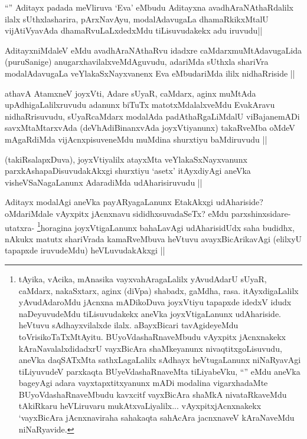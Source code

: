 \begin{artha}
``\stext'' Aditayx padada meVliruva `Eva' eMbudu Aditayxna avadhAraNAthaRdalilx ilalx sUthxlasharira, pArxNavAyu, modalAdavugaLa dhamaRkikxMtalU vijAtiVyavAda dhamaRvuLaLxdedxMdu tiLisuvudakekx adu iruvudu||
\end{artha}

\begin{artha}
AditayxniMdaleV eMdu avadhAraNAthaRvu idadxre caMdarxmuMtAdavugaLida (puruSanige) anugarxhavilalxveMdAguvudu, adariMda sUthxla shariVra modalAdavugaLa veYlakaSxNayxvanenx Eva eMbudariMda ililx nidhaRriside || 
\end{artha}
\begin{artha}
athavA AtamxneV joyxVti, Adare sUyaR, caMdarx, aginx muMtAda upAdhigaLalilxruvudu adanunx biTuTx matotxMdalalxveMdu EvakAravu nidhaRrisuvudu, sUyaRcaMdarx modalAda padAthaRgaLiMdalU viBajanemADi savxMtaMtarxvAda (deVhAdiBinanxvAda joyxVtiyanunx) takaRveMba oMdeV mAgaRdiMda vijAcnxpisuveneMdu muMdina shurxtiyu baMdiruvudu ||
\end{artha}

\begin{artha}
(takiRsalapxDuva), joyxVtiyalilx atayxMta veYlakaSxNayxvanunx parxkAshapaDisuvudakAkxgi shurxtiyu `asetx' itAyxdiyAgi aneVka visheVSaNagaLanunx AdaradiMda udAharisiruvudu ||
\end{artha}

\begin{artha}
Aditayx modalAgi aneVka payARyagaLanunx EtakAkxgi udAhariside? oMdariMdale vAyxpitx jAcnxnavu sididhxsuvadaSeTx? eMdu parxshinxsidare- utatxra- \footnote{tAyika, vAcika, mAnasika vayxvahAragaLalilx yAvudAdarU sUyaR, caMdarx, nakaSxtarx, aginx (diVpa) shabadx, gaMdha, rasa. itAyxdigaLalilx  yAvudAdaroMdu jAcnxna mADikoDuva joyxVtiyu tapapxde idedxV idudx naDeyuvudeMdu tiLisuvudakekx aneVka joyxVtigaLanunx udAhariside. heVtuvu sAdhayxvilalxde ilalx. aBayxBicari tavAgideyeMdu toVrisikoTaTxMtAyitu. BUyoVdashaRnaveMbudu vAyxpitx jAcnxnakekx kAraNavalalxdidadxrU vayxBicAra shaMkeyanunx nivaqtitxgoLisuvudu, aneVka daqSATxMta sathxLagaLalilx sAdhayx heVtugaLanunx niNaRyavAgi tiLiyuvudeV parxkaqta BUyeVdashaRnaveMta tiLiyabeVku, ``\stext'' eMdu aneVka bageyAgi adara vayxtapxtitxyanunx mADi modalina vigarxhadaMte BUyoVdashaRnaveMbudu kavxcitf vayxBicAra shaMkA nivataRkaveMdu tAkiRkaru heVLiruvaru mukAtxvaLiyalilx... vAyxpitxjAcnxnakekx `vayxBicAra jAcnxnaviraha sahakaqta sahAcAra jacnxnaveV kAraNaveMdu niNaRyavide.}horagina joyxVtigaLanunx bahaLavAgi udAharisidUdx saha budidhx, nAkukx matutx shariVrada kamaRveMbuva heVtuvu avayxBicArikavAgi (elilxyU tapapxde iruvudeMdu) heVLuvudakAkxgi ||
\end{artha}

